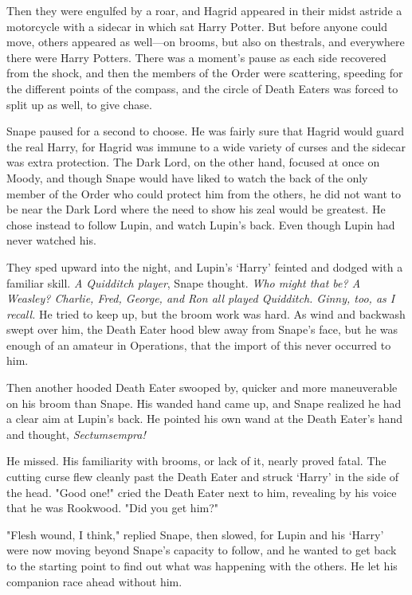 Then they were engulfed by a roar, and Hagrid appeared in their midst astride a motorcycle with a sidecar in which sat Harry Potter. But before anyone could move, others appeared as well—on brooms, but also on thestrals, and everywhere there were Harry Potters. There was a moment's pause as each side recovered from the shock, and then the members of the Order were scattering, speeding for the different points of the compass, and the circle of Death Eaters was forced to split up as well, to give chase.

Snape paused for a second to choose. He was fairly sure that Hagrid would guard the real Harry, for Hagrid was immune to a wide variety of curses and the sidecar was extra protection. The Dark Lord, on the other hand, focused at once on Moody, and though Snape would have liked to watch the back of the only member of the Order who could protect him from the others, he did not want to be near the Dark Lord where the need to show his zeal would be greatest. He chose instead to follow Lupin, and watch Lupin's back. Even though Lupin had never watched his.

They sped upward into the night, and Lupin's `Harry' feinted and dodged with a familiar skill. \emph{A Quidditch player}, Snape thought. \emph{Who might that be? A Weasley? Charlie, Fred, George, and Ron all played Quidditch. Ginny, too, as I recall.} He tried to keep up, but the broom work was hard. As wind and backwash swept over him, the Death Eater hood blew away from Snape's face, but he was enough of an amateur in Operations, that the import of this never occurred to him.

Then another hooded Death Eater swooped by, quicker and more maneuverable on his broom than Snape. His wanded hand came up, and Snape realized he had a clear aim at Lupin's back. He pointed his own wand at the Death Eater's hand and thought, \emph{Sectumsempra!}

He missed. His familiarity with brooms, or lack of it, nearly proved fatal. The cutting curse flew cleanly past the Death Eater and struck `Harry' in the side of the head. "Good one!" cried the Death Eater next to him, revealing by his voice that he was Rookwood. "Did you get him?"

"Flesh wound, I think," replied Snape, then slowed, for Lupin and his `Harry' were now moving beyond Snape's capacity to follow, and he wanted to get back to the starting point to find out what was happening with the others. He let his companion race ahead without him.

